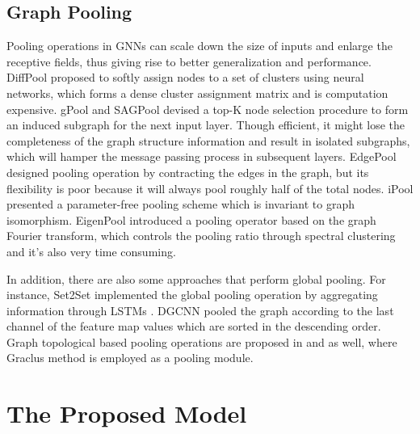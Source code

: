 \documentclass[letterpaper]{article} \usepackage{aaai20}  \usepackage{times}  \usepackage{helvet} \usepackage{courier}  \usepackage[hyphens]{url}  \usepackage{graphicx} \urlstyle{rm} \def\UrlFont{\rm}  \usepackage{graphicx}  \frenchspacing  \setlength{\pdfpagewidth}{8.5in}  \setlength{\pdfpageheight}{11in}
\begin{document}
\subsection{Graph Pooling}
Pooling operations in GNNs can scale down the size of inputs and enlarge the receptive fields, thus giving rise to better generalization and performance. DiffPool \cite{ying2018hierarchical} proposed to softly assign nodes to a set of clusters using neural networks, which forms a dense cluster assignment matrix and is computation expensive. gPool \cite{gao2019graph} and SAGPool \cite{lee2019self} devised a top-K node selection procedure to form an induced subgraph for the next input layer. Though efficient, it might lose the completeness of the graph structure information and result in isolated subgraphs, which will hamper the message passing process in subsequent layers. EdgePool \cite{diehl2019edge} designed pooling operation by contracting the edges in the graph, but its flexibility is poor because it will always pool roughly half of the total nodes. iPool \cite{gao2019ipool} presented a parameter-free pooling scheme which is invariant to graph isomorphism. EigenPool \cite{ma2019graph} introduced a pooling operator based on the graph Fourier transform, which controls the pooling ratio through spectral clustering and it's also very time consuming.

In addition, there are also some approaches that perform global pooling. For instance, Set2Set \cite{vinyals2015order} implemented the global pooling operation by aggregating information through LSTMs \cite{hochreiter1997long}. DGCNN \cite{zhang2018end} pooled the graph according to the last channel of the feature map values which are sorted in the descending order. Graph topological based pooling operations are proposed in \cite{defferrard2016convolutional} and \cite{rhee2017hybrid} as well, where Graclus method \cite{dhillon2007weighted} is employed as a pooling module. 

\section{The Proposed Model}
\end{document}
